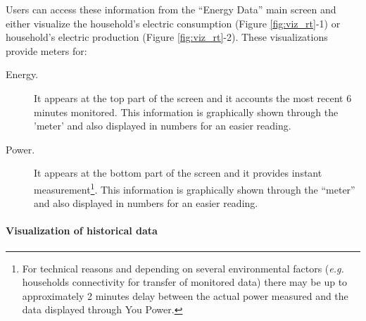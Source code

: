 Users can access these information from the ``Energy Data'' main screen and either visualize the household's electric consumption (Figure \ref{fig:viz_rt}-1) or
household's electric production (Figure \ref{fig:viz_rt}-2).
These visualizations provide meters for:
\begin{description}
 \item[Energy.] It appears at the top part of the screen and it accounts the most recent 6 minutes monitored.
 This information is graphically shown through the 'meter' and also displayed in numbers for an easier reading.
 \item[Power.] It appears at the bottom part of the screen and it provides instant measurement\footnote{For technical reasons and depending on several environmental factors (\textit{e.g.} households connectivity for transfer of monitored data) there may be up to approximately 2 minutes delay between the actual power measured and the data displayed through You Power.}.
 This information is graphically shown through the ``meter'' and also displayed in numbers for an easier reading.
\end{description}



\paragraph{Visualization of historical data} 

